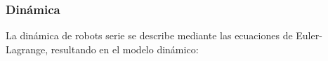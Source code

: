 










\subsubsection{Dinámica}

La dinámica de robots serie se describe mediante las ecuaciones de Euler-Lagrange, resultando en el modelo dinámico:

